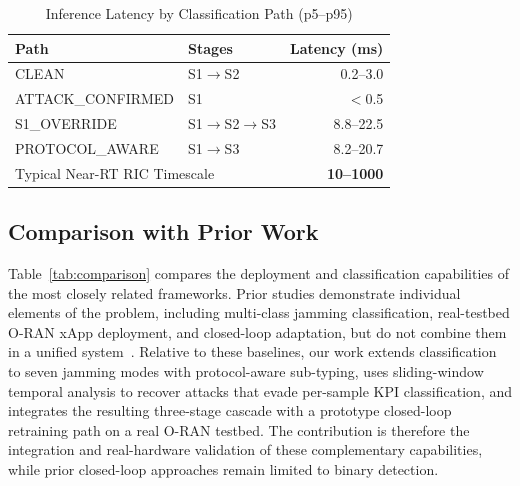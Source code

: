 \documentclass[conference]{IEEEtran}
\begin{document}
\begin{table}[t]
\centering
\caption{Inference Latency by Classification Path (p5--p95)}
\label{tab:latency}
\small
\begin{tabular}{llr}
\toprule
Path & Stages & Latency (ms) \\
\midrule
CLEAN & S1$\rightarrow$S2 & 0.2--3.0 \\
ATTACK\_CONFIRMED & S1 & $<$0.5 \\
S1\_OVERRIDE & S1$\rightarrow$S2$\rightarrow$S3 & 8.8--22.5 \\
PROTOCOL\_AWARE & S1$\rightarrow$S3 & 8.2--20.7 \\
\midrule
\multicolumn{2}{l}{Typical Near-RT RIC Timescale} & \textbf{10--1000} \\
\bottomrule
\end{tabular}
\end{table}

\subsection{Comparison with Prior Work}

Table~\ref{tab:comparison} compares the deployment and classification capabilities of the most closely related frameworks. Prior studies demonstrate individual elements of the problem, including multi-class jamming classification, real-testbed O-RAN xApp deployment, and closed-loop adaptation, but do not combine them in a unified system~\cite{hachimi2020,jere2024,moore2025,pazperez2025,rahman2025}. Relative to these baselines, our work extends classification to seven jamming modes with protocol-aware sub-typing, uses sliding-window temporal analysis to recover attacks that evade per-sample KPI classification, and integrates the resulting three-stage cascade with a prototype closed-loop retraining path on a real O-RAN testbed. The contribution is therefore the integration and real-hardware validation of these complementary capabilities, while prior closed-loop approaches remain limited to binary detection.
\end{document}
